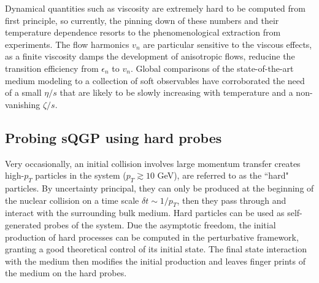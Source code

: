 Dynamical quantities such as viscosity are extremely hard to be computed from first principle, so currently, the pinning down of these numbers and their temperature dependence resorts to the phenomenological extraction from experiments.
The flow harmonics $v_n$ are particular sensitive to the viscous effects, as a finite viscosity damps the development of anisotropic flows, reducine the transition efficiency from $\epsilon_n$ to $v_n$.
Global comparisons of the state-of-the-art medium modeling to a collection of soft observables have corroborated the need of a small $\eta/s$ that are likely to be slowly increasing with temperature and a non-vanishing $\zeta/s$.

\subsection{Probing sQGP using hard probes}
Very occasionally, an initial collision involves large momentum transfer creates high-$p_T$ particles in the system ($p_T\gtrsim 10$ GeV), are referred to as the ``hard" particles.
By uncertainty principal, they can only be produced at the beginning of the nuclear collision on a time scale $\delta t \sim 1/p_T$, then they pass through and interact with the surrounding bulk medium.
Hard particles can be used as self-generated probes of the system.
Due the asymptotic freedom, the initial production of hard processes can be computed in the perturbative framework, granting a good theoretical control of its initial state.
The final state interaction with the medium then modifies the initial production and leaves finger prints of the medium on the hard probes.

